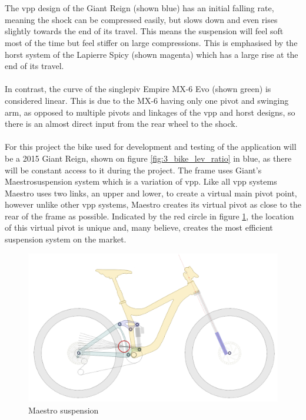 		\\\\
		The \gls{vpp} design of the Giant Reign (shown blue) has an initial falling rate, meaning the \gls{shock} can be compressed easily, but slows down and even rises slightly towards the end of its travel. This means the suspension will feel soft most of the time but feel stiffer on large compressions. This is emphasised by the \gls{horst} system of the Lapierre Spicy (shown magenta) which has a large rise at the end of its travel.
		\\\\
		In contrast, the curve of the \gls{singlepiv} Empire MX-6 Evo (shown green) is considered linear. This is due to the MX-6 having only one pivot and swinging arm, as opposed to multiple pivots and linkages of the \gls{vpp} and \gls{horst} designs, so there is an almost direct input from the rear wheel to the \gls{shock}.
		\\\\
		For this project the bike used for development and testing of the application will be a 2015 Giant Reign, shown on figure \ref{fig:3_bike_lev_ratio} in blue, as there will be constant access to it during the project. The frame uses Giant's Maestro\texttrademark suspension system which is a variation of \gls{vpp}. Like all \gls{vpp} systems Maestro uses two links, an upper and lower, to create a virtual main pivot point, however unlike other \gls{vpp} systems, Maestro creates its virtual pivot as close to the rear of the frame as possible. Indicated by the red circle in figure \ref{fig:maestro}, the location of this virtual pivot is unique and, many believe, creates the most efficient suspension system on the market.
		\begin{figure}[h!]
			\centering
			\includegraphics[width=12cm]{../images/reignsch.PNG}
			\caption{Maestro suspension}
			\label{fig:maestro}
		\end{figure}
